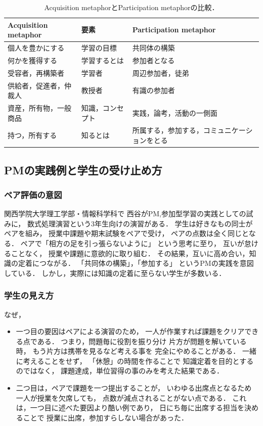 \documentclass[a4,p11]{article}
\begin{document}
\begin{table}[bt]
\caption{\label{tab:org8fffae7}
Acquisition metaphorとParticipation metaphorの比較．}
\centering
\begin{tabular}{lll}
\hline
Acquisition metaphor & 要素 & Participation metaphor\\
\hline
個人を豊かにする & 学習の目標 & 共同体の構築\\
何かを獲得する & 学習するとは & 参加者となる\\
受容者，再構築者 & 学習者 & 周辺参加者，徒弟\\
供給者，促進者，仲裁人 & 教授者 & 有識の参加者\\
資産，所有物，一般商品 & 知識，コンセプト & 実践，論考，活動の一側面\\
持つ，所有する & 知るとは & 所属する，参加する，コミュニケーションをとる\\
\hline
\end{tabular}
\end{table}

\subsection{PMの実践例と学生の受け止め方}
\label{sec:org783a658}
\subsubsection{ペア評価の意図}
\label{sec:org05d030c}
関西学院大学理工学部・情報科学科で
西谷がPM,参加型学習の実践としての試みに，
数式処理演習という3年生向けの演習がある．
学生は好きなもの同士がペアを組み，
授業中課題や期末試験をペアで受け，
ペアの点数は全く同じとなる．
ペアで「相方の足を引っ張らないように」
という思考に至り，
互いが怠けることなく，
授業や課題に意欲的に取り組む．
その結果，互いに高め合い，知識の定着につながる．
「共同体の構築」，「参加する」
というPMの実践を意図している．
しかし，実際には知識の定着に至らない学生が多数いる．
\subsubsection{学生の見え方}
\label{sec:org5fe080c}
なぜ，
\begin{itemize}
\item 一つ目の要因はペアによる演習のため，
一人が作業すれば課題をクリアできる点である．
つまり，問題毎に役割を振り分け 
片方が問題を解いている時，
もう片方は携帯を見るなど考える事を
完全にやめることがある．
一緒に考えることをせず，
「休憩」の時間を作ることで
知識定着を目的とするのではなく，
課題達成，単位習得の事のみを考えた結果である．

\item 二つ目は，ペアで課題を一つ提出することが，
いわゆる出席点となるため
一人が授業を欠席しても，
点数が減点されることがない点である．
これは，一つ目に述べた要因より酷い例であり，
日にち毎に出席する担当を決めることで
授業に出席，参加すらしない場合があった．
\end{itemize}
\end{document}
